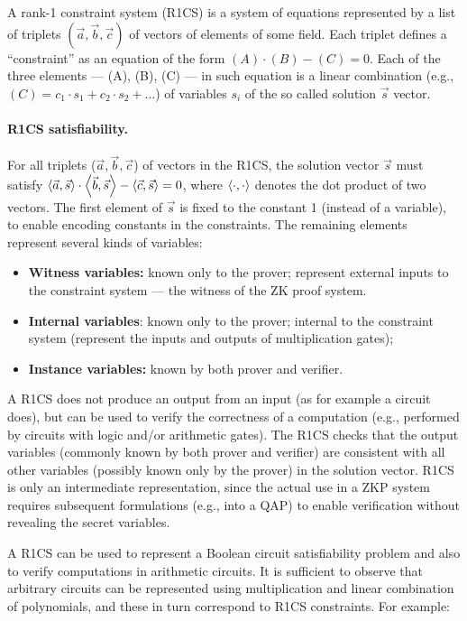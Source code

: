 	A rank-1 constraint system (R1CS) is a system of equations represented by a 
list of triplets $(\vec{a}, \vec{b}, \vec{c})$ of vectors of elements of some field.
	Each triplet defines a ``constraint'' as an equation of the form $(A) \cdot (B) - (C) = 0$.
	Each of the three elements --- (A), (B), (C) --- in such equation is a linear combination 
(e.g., $(C) = c_1 \cdot s_1 + c_2 \cdot s_2 + ...$) of variables $s_i$ of the so called solution $\vec{s}$ vector.


\paragraph{R1CS satisfiability.}
	For all triplets ($\vec{a}, \vec{b}, \vec{c}$) of vectors in the R1CS, the solution vector $\vec{s}$ must satisfy 
$\left\langle \vec{a}, \vec{s}\right\rangle \cdot \left\langle \vec{b}, \vec{s}\right\rangle - \left\langle \vec{c}, \vec{s}\right\rangle = 0$, 
where $\left\langle \cdot, \cdot\right\rangle$ denotes the dot product of two vectors.
	The first element of $\vec{s}$ is fixed to the constant 1 (instead of a variable), to enable encoding constants in the constraints.
	The remaining elements represent several kinds of variables:
	\begin{itemize}
	\item \textbf{Witness variables:} 
	known only to the prover; represent external inputs to the constraint system --- the witness of the ZK proof system.
	\item \textbf{Internal variables}: 
	known only to the prover; internal to the constraint system (represent the inputs and outputs of multiplication gates);
	\item \textbf{Instance variables:} known by both prover and verifier.
	\end{itemize}

	A R1CS does not produce an output from an input (as for example a circuit does), but can be used to 
verify the correctness of a computation (e.g., performed by circuits with logic and/or arithmetic gates).
	The R1CS checks that the output variables (commonly known by both prover and verifier) are 
consistent with all other variables (possibly known only by the prover) in the solution vector.
	R1CS is only an intermediate representation, since the actual use in a ZKP system requires 
subsequent formulations (e.g., into a QAP) to enable verification without revealing the secret variables.


	A R1CS can be used to represent a Boolean circuit satisfiability 
problem and also to verify computations in arithmetic circuits.
	It is sufficient to observe that arbitrary circuits can be represented 
using multiplication and linear combination of polynomials, and these 
in turn correspond to R1CS constraints. For example:

